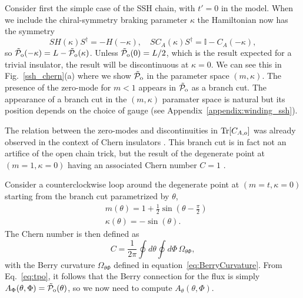 \documentclass[twocolumn,amsmath,longbibliography,amssymb,superscriptaddress]{revtex4-1}
\newcommand{\tpo}{\tilde{\mathcal{P}}_{\rm o}}
\begin{document}
Consider first the simple case of the SSH chain, with $t'=0$ in the model. When we include the chiral-symmetry braking parameter $\kappa$ the Hamiltonian now has the symmetry
\begin{equation}
SH(\kappa)S^\dagger = -H(-\kappa), \quad S C_A(\kappa) S^\dagger = \mathbb{I}-C_A(-\kappa),
\end{equation}
so $\tpo(-\kappa) = L-\tpo(\kappa)$. Unless $\tpo(0) = L/2$, which is the result expected for a trivial insulator, the result will be discontinuous at $\kappa = 0$. We can see this in Fig.~\ref{ssh_chern}(a) where we show $\tpo$ in the parameter space $(m,\kappa)$. The presence of the zero-mode for $m<1$ appears in $\tpo$ as a branch cut. The appearance of a branch cut in the $(m,\kappa)$ paramater space is natural but its position depends on the choice of gauge (see Appendix~\ref{appendix:winding_ssh}).

The relation between the zero-modes and discontinuities in $\Tr[C_{A,o}]$ was already observed in the context of Chern insulators \cite{Alexandrinata2011}. This branch cut is in fact not an artifice of the open chain trick, but the result of the degenerate point at $(m=1,\kappa=0)$ having an associated Chern number $C=1$ \cite{Asboth2016}.

Consider a counterclockwise loop around the degenerate point at $(m=t,\kappa=0)$ starting from the branch cut parametrized by $\theta$,
\begin{align*}
& m(\theta) = 1+\frac{1}{2}\sin(\theta-\frac{\pi}{2}) \\
& \kappa(\theta) = -\sin(\theta).
\end{align*}
The Chern number is then defined as
\begin{equation}
C = \frac{1}{2\pi}\oint d\theta\oint d\Phi \, \Omega_{\theta\Phi},
\label{eq:chern}
\end{equation} 
with the Berry curvature $\Omega_{\theta\Phi}$ defined in equation~\eqref{eq:BerryCurvature}. 
From  Eq.~\eqref{eq:tpo}, it follows that the Berry connection for the flux is simply $A_\Phi(\theta,\Phi) = \tpo(\theta)$, so we now need to compute $A_\theta(\theta,\Phi)$. 
\end{document}
